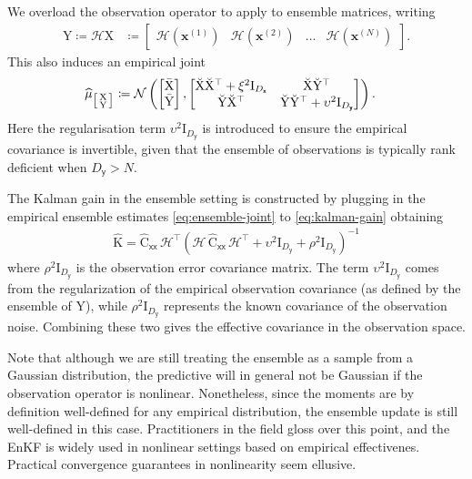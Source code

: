 \documentclass[wcp]{jmlr} %
\newcommand{\vv}[1]{\boldsymbol{#1}}
\newcommand{\mm}[1]{\mathrm{#1}}
\newcommand{\mmmean}[1]{\bar{\mathrm{#1}}}
\newcommand{\mmdev}[1]{\breve{\mathrm{#1}}}
\newcommand{\rv}[1]{\mathsf{#1}}
\newcommand{\vrv}[1]{\vv{\rv{#1}}}
\newcommand{\op}[1]{\mathcal{#1}}
\newcommand{\Normal}{\mathcal{N}}
\begin{document}
We overload the observation operator to apply to ensemble matrices, writing
\begin{align}
    \mm{Y}\coloneq\op{H}\mm{X} &\coloneq \begin{bmatrix}\op{H}(\vv{x}^{(1)}) & \op{H}(\vv{x}^{(2)})& \dots& \op{H}(\vv{x}^{(N)})\end{bmatrix}.
\end{align}
This also induces an empirical joint
\begin{align}
    \ELaw[{\left[\begin{smallmatrix}
        \mm{X}\\
        \mm{Y}
    \end{smallmatrix}\right]}] &\coloneq \Normal\left(\begin{bmatrix}
        \mmmean{X}\\
        \mmmean{Y}
    \end{bmatrix},
    \begin{bmatrix}
        \mmdev{X} \mmdev{X}^\top + \xi^2\mm{I}_{D_{\vrv{x}}} & \mmdev{X} \mmdev{Y}^\top \\
        \mmdev{Y} \mmdev{X}^\top  & \mmdev{Y} \mmdev{Y}^\top + \upsilon^2\mm{I}_{D_{\vrv{y}}}
    \end{bmatrix}
    \right).\label{eq:ensemble-joint}
\end{align}
Here the regularisation term \(\upsilon^2\mm{I}_{D_{\vrv{y}}}\) is introduced to ensure the empirical covariance is invertible, given that the ensemble of observations is typically rank deficient when \(D_{\vrv{y}}>N\).

The Kalman gain in the ensemble setting is constructed by plugging in the empirical ensemble estimates \eqref{eq:ensemble-joint} to \eqref{eq:kalman-gain} obtaining
\begin{align}
\widehat{\mm{K}}= \widehat{\mm{C}}_{\vrv{xx}}\, \op{H}^\top \left(\op{H}\,\widehat{\mm{C}}_{\vrv{xx}}\,\op{H}^\top + \upsilon^2\mm{I}_{D_{\vrv{y}}} + \rho^2\mm{I}_{D_{\vrv{y}}}\right)^{-1}\label{eq:ensemble-kalman-gain}
\end{align}
where \(\rho^2\mm{I}_{D_{\vrv{y}}}\) is the observation error covariance matrix.
The term
\(\upsilon^2\mm{I}_{D_{\vrv{y}}}\) comes from the regularization of the empirical observation covariance (as defined by the ensemble of
\(\mm{Y}\)), while \(\rho^2\mm{I}_{D_{\vrv{y}}}\) represents the known covariance of the observation noise.
Combining these two gives the effective covariance in the observation space.

Note that although we are still treating the ensemble as a sample from a Gaussian distribution, the predictive will in general not be Gaussian if the observation operator is nonlinear.
Nonetheless, since the moments are by definition well-defined for any empirical distribution, the ensemble update is still well-defined in this case.
Practitioners in the field gloss over this point, and the EnKF is widely used in nonlinear settings based on empirical effectivenes.
Practical convergence guarantees in nonlinearity seem ellusive.
\end{document}
